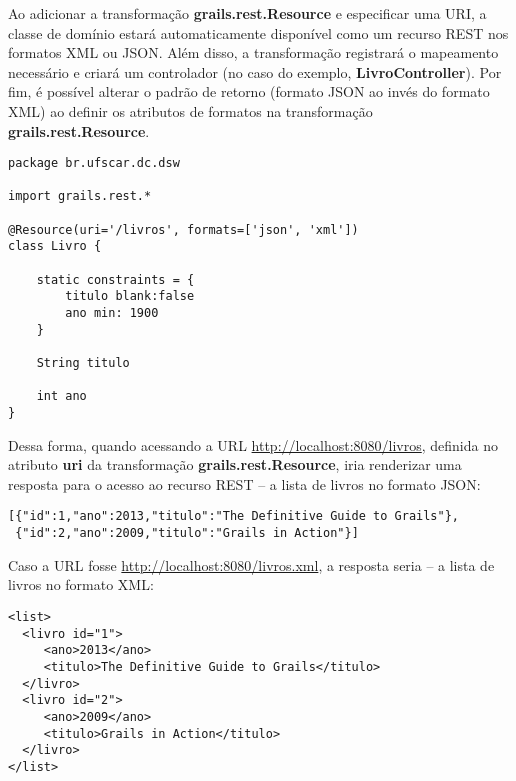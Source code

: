 \vspace{0.2cm}

Ao adicionar a transformação {\bf grails.rest.Resource} e especificar uma URI, a
classe de  domínio estará  automaticamente disponível como  um recurso  REST nos
formatos  XML ou  JSON.  Além  disso, a  transformação  registrará o  mapeamento
necessário   e    criará   um   controlador   (no   caso    do   exemplo,   {\bf
  LivroController}). Por  fim, é possível  alterar o padrão de  retorno (formato
JSON  ao  invés  do  formato  XML)  ao  definir  os  atributos  de  formatos  na
transformação {\bf grails.rest.Resource}.

\begin{lstlisting}[caption=Classe de domínio -- recurso REST, frame = trBL,
    float=htbp, label=codREST] 
package br.ufscar.dc.dsw

import grails.rest.*

@Resource(uri='/livros', formats=['json', 'xml'])
class Livro {

    static constraints = {
        titulo blank:false
        ano min: 1900
    }

    String titulo

    int ano
}
\end{lstlisting}

Dessa forma, quando acessando a URL \url{http://localhost:8080/livros}, definida
no  atributo  {\bf  uri}   da  transformação  {\bf  grails.rest.Resource},  iria
renderizar uma resposta  para o acesso ao  recurso REST -- a lista  de livros no
formato JSON: 

\vspace{0.5cm}

\begin{cBox}
\begin{scriptsize}
\begin{verbatim}
[{"id":1,"ano":2013,"titulo":"The Definitive Guide to Grails"},
 {"id":2,"ano":2009,"titulo":"Grails in Action"}]
\end{verbatim}
\end{scriptsize}
\end{cBox}

\vspace{0.5cm}

Caso a  URL fosse \url{http://localhost:8080/livros.xml}, a resposta  seria -- a
lista de livros no formato XML:

\vspace{0.5cm}

\begin{cBox}
\begin{scriptsize}
\begin{verbatim}
<list>
  <livro id="1">
     <ano>2013</ano>
     <titulo>The Definitive Guide to Grails</titulo>
  </livro>
  <livro id="2">
     <ano>2009</ano>
     <titulo>Grails in Action</titulo>
  </livro>
</list>
\end{verbatim}
\end{scriptsize}
\end{cBox}

